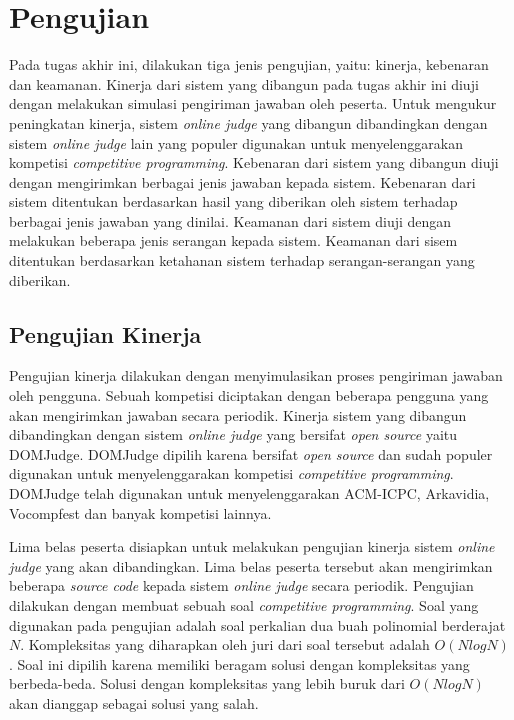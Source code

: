 \section{Pengujian}

\par Pada tugas akhir ini, dilakukan tiga jenis pengujian, yaitu: kinerja, kebenaran dan keamanan. Kinerja dari sistem yang dibangun pada tugas akhir ini diuji dengan melakukan simulasi pengiriman jawaban oleh peserta. Untuk mengukur peningkatan kinerja, sistem \textit{online judge} yang dibangun dibandingkan dengan sistem \textit{online judge} lain yang populer digunakan untuk menyelenggarakan kompetisi \textit{competitive programming}. Kebenaran dari sistem yang dibangun diuji dengan mengirimkan berbagai jenis jawaban kepada sistem. Kebenaran dari sistem ditentukan berdasarkan hasil yang diberikan oleh sistem terhadap berbagai jenis jawaban yang dinilai. Keamanan dari sistem diuji dengan melakukan beberapa jenis serangan kepada sistem. Keamanan dari sisem ditentukan berdasarkan ketahanan sistem terhadap serangan-serangan yang diberikan.

\subsection{Pengujian Kinerja}

\par Pengujian kinerja dilakukan dengan menyimulasikan proses pengiriman jawaban oleh pengguna. Sebuah kompetisi diciptakan dengan beberapa pengguna yang akan mengirimkan jawaban secara periodik. Kinerja sistem yang dibangun dibandingkan dengan sistem \textit{online judge} yang bersifat \textit{open source} yaitu DOMJudge. DOMJudge dipilih karena bersifat \textit{open source} dan sudah populer digunakan untuk menyelenggarakan kompetisi \textit{competitive programming}. DOMJudge telah digunakan untuk menyelenggarakan ACM-ICPC, Arkavidia, Vocompfest dan banyak kompetisi lainnya.

\par Lima belas peserta disiapkan untuk melakukan pengujian kinerja sistem \textit{online judge} yang akan dibandingkan. Lima belas peserta tersebut akan mengirimkan beberapa \textit{source code} kepada sistem \textit{online judge} secara periodik. Pengujian dilakukan dengan membuat sebuah soal \textit{competitive programming}. Soal yang digunakan pada pengujian adalah soal perkalian dua buah polinomial berderajat $N$. Kompleksitas yang diharapkan oleh juri dari soal tersebut adalah $O(N log N)$. Soal ini dipilih karena memiliki beragam solusi dengan kompleksitas yang berbeda-beda. Solusi dengan kompleksitas yang lebih buruk dari $O(N log N)$ akan dianggap sebagai solusi yang salah.

